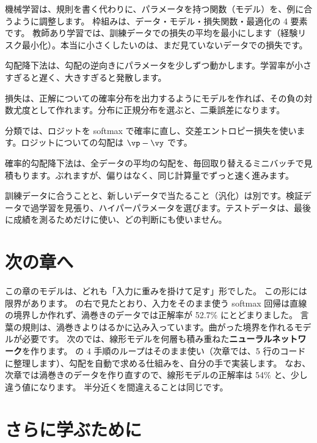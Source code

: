 \begin{summary}
\item 機械学習は、規則を書く代わりに、パラメータを持つ関数（モデル）を、例に合うように調整します。
枠組みは、データ・モデル・損失関数・最適化の 4 要素です。
教師あり学習では、訓練データでの損失の平均を最小にします（経験リスク最小化）。本当に小さくしたいのは、まだ見ていないデータでの損失です。
\item 勾配降下法は、勾配の逆向きにパラメータを少しずつ動かします。学習率が小さすぎると遅く、大きすぎると発散します。
\item 損失は、正解についての確率分布を出力するようにモデルを作れば、その負の対数尤度として作れます。分布に正規分布を選ぶと、二乗誤差になります。
\item 分類では、ロジットを softmax で確率に直し、交差エントロピー損失を使います。ロジットについての勾配は $\vp-\vy$ です。
\item 確率的勾配降下法は、全データの平均の勾配を、毎回取り替えるミニバッチで見積もります。ぶれますが、偏りはなく、同じ計算量でずっと速く進みます。
\item 訓練データに合うことと、新しいデータで当たること（汎化）は別です。検証データで過学習を見張り、ハイパーパラメータを選びます。テストデータは、最後に成績を測るためだけに使い、どの判断にも使いません。
\end{summary}

\section*{次の章へ}

この章のモデルは、どれも「入力に重みを掛けて足す」形でした。
この形には限界があります。
の右で見たとおり、入力をそのまま使う softmax 回帰は直線の境界しか作れず、渦巻きのデータでは正解率が 52.7\% にとどまりました。
言葉の規則は、渦巻きよりはるかに込み入っています。曲がった境界を作れるモデルが必要です。
次のでは、線形モデルを何層も積み重ねた\textbf{ニューラルネットワーク}を作ります。
の 4 手順のループはそのまま使い（次章では、5 行のコードに整理します）、勾配を自動で求める仕組みを、自分の手で実装します。
なお、次章では渦巻きのデータを作り直すので、線形モデルの正解率は 54\% と、少し違う値になります。
半分近くを間違えることは同じです。

\section*{さらに学ぶために}

